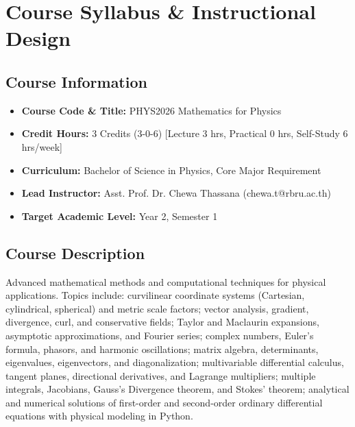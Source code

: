 \chapter*{Course Syllabus \& Instructional Design}

\section*{Course Information}
\begin{itemize}
    \item \textbf{Course Code \& Title:} PHYS2026 Mathematics for Physics
    \item \textbf{Credit Hours:} 3 Credits (3-0-6) [Lecture 3 hrs, Practical 0 hrs, Self-Study 6 hrs/week]
    \item \textbf{Curriculum:} Bachelor of Science in Physics, Core Major Requirement
    \item \textbf{Lead Instructor:} Asst. Prof. Dr. Chewa Thassana (chewa.t@rbru.ac.th)
    \item \textbf{Target Academic Level:} Year 2, Semester 1
\end{itemize}

\section*{Course Description}
Advanced mathematical methods and computational techniques for physical applications. Topics include: curvilinear coordinate systems (Cartesian, cylindrical, spherical) and metric scale factors; vector analysis, gradient, divergence, curl, and conservative fields; Taylor and Maclaurin expansions, asymptotic approximations, and Fourier series; complex numbers, Euler's formula, phasors, and harmonic oscillations; matrix algebra, determinants, eigenvalues, eigenvectors, and diagonalization; multivariable differential calculus, tangent planes, directional derivatives, and Lagrange multipliers; multiple integrals, Jacobians, Gauss's Divergence theorem, and Stokes' theorem; analytical and numerical solutions of first-order and second-order ordinary differential equations with physical modeling in Python.

